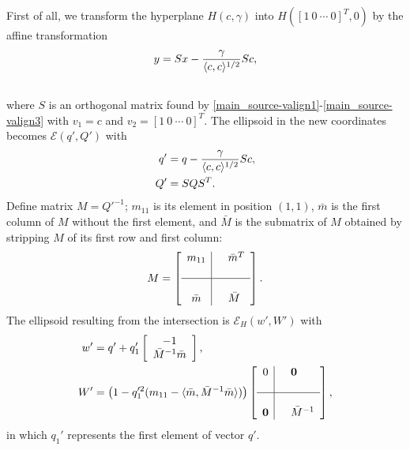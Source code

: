 \documentclass[letterpaper,10pt,english]{sphinxmanual}
\begin{document}
First of all, we transform the hyperplane $H(c,\gamma)$ into
$H([1~0~\cdots~0]^T, 0)$ by the affine transformation
\begin{gather}
\begin{split}y = Sx - \frac{\gamma}{\langle c,c\rangle^{1/2}}Sc,\end{split}\notag\\\begin{split}\end{split}\notag
\end{gather}
where $S$ is an orthogonal matrix found by \eqref{main_source-valign1}-\eqref{main_source-valign3}
with $v_1=c$ and $v_2=[1~0~\cdots~0]^T$. The ellipsoid in
the new coordinates becomes ${\mathcal E}(q',Q')$ with
\begin{gather}
\begin{split}\begin{aligned}
q' & = q-\frac{\gamma}{\langle c,c\rangle^{1/2}}Sc, \\
Q' & = SQS^T.\end{aligned}\end{split}\notag
\end{gather}
Define matrix $M=Q'^{-1}$; $m_{11}$ is its element in
position $(1,1)$, $\bar{m}$ is the first column of $M$
without the first element, and $\bar{M}$ is the submatrix of
$M$ obtained by stripping $M$ of its first row and first
column:
\begin{gather}
\begin{split}M = \left[\begin{array}{c|cl}
m_{11} & & \bar{m}^T\\
 & \\
\hline
 & \\
\bar{m} & & \bar{M}\end{array}\right].\end{split}\notag
\end{gather}
The ellipsoid resulting from the intersection is
${\mathcal E}_H(w',W')$ with
\begin{gather}
\begin{split}\begin{aligned}
w' & = q' + q_1'\left[\begin{array}{c}
-1\\
\bar{M}^{-1}\bar{m}\end{array}\right],\\
W' & = \left(1-q_1'^2(m_{11}-
\langle\bar{m},\bar{M}^{-1}\bar{m}\rangle)\right)\left[\begin{array}{c|cl}
0 & & {\bf 0}\\
 & \\
\hline
 & \\
{\bf 0} & & \bar{M}^{-1}\end{array}\right],\end{aligned}\end{split}\notag
\end{gather}
in which $q_1'$ represents the first element of vector $q'$.
\end{document}

